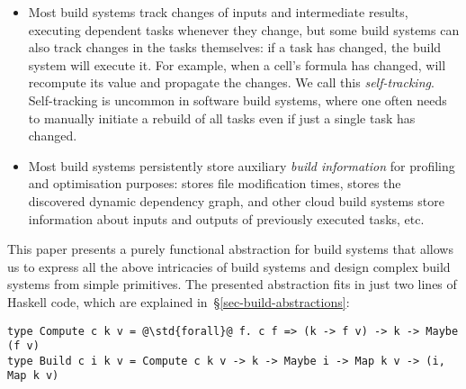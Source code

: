 \begin{itemize}
    \item Most build systems track changes of inputs and intermediate results,
    executing dependent tasks whenever they change, but some build systems can
    also track changes in the tasks themselves: if a task has changed, the build
    system will execute it. For example, when a cell's formula has changed,
    \Excel will recompute its value and propagate the changes. We call this
    \emph{self-tracking}. Self-tracking is uncommon in software build systems,
    where one often needs to manually initiate a rebuild of all tasks even if
    just a single task has changed.

    \item Most build systems persistently store auxiliary \emph{build
    information} for profiling and optimisation purposes: \Make stores file
    modification times, \Shake stores the discovered dynamic dependency graph,
    \Bazel and other cloud build systems store information about inputs and
    outputs of previously executed tasks, etc.
\end{itemize}

This paper presents a purely functional abstraction for build systems that
allows us to express all the above intricacies of build systems and design
complex build systems from simple primitives. The presented abstraction fits in
just two lines of Haskell code, which are explained
in~\S\ref{sec-build-abstractions}:

\begin{verbatim}
type Compute c k v = @\std{forall}@ f. c f => (k -> f v) -> k -> Maybe (f v)
type Build c i k v = Compute c k v -> k -> Maybe i -> Map k v -> (i, Map k v)
\end{verbatim}



